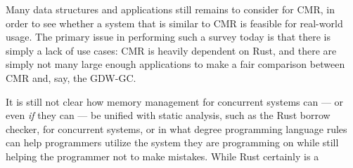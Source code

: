 Many data structures and applications still remains to consider for CMR\@, in order to see whether
a system that is similar to CMR is feasible for real-world usage. The primary issue in performing
such a survey today is that there is simply a lack of use cases: CMR is heavily dependent on Rust,
and there are simply not many large enough applications to make a fair comparison between CMR and,
say, the GDW-GC\@.

It is still not clear how memory management for concurrent systems can --- or even \emph{if} they
can --- be unified with static analysis, such as the Rust borrow checker, for concurrent systems,
or in what degree programming language rules can help programmers utilize the system they are
programming on while still helping the programmer not to make mistakes. While Rust certainly is a
